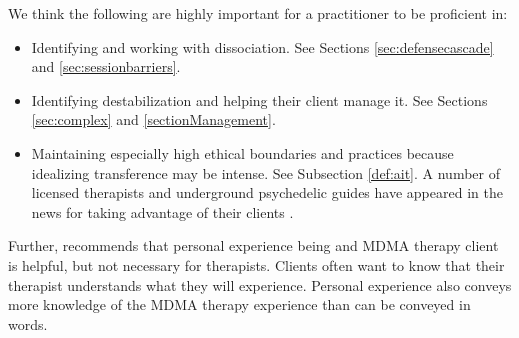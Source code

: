 \documentclass[12pt,letterpaper]{book}
\begin{document}
We think the following are highly important for a practitioner to be proficient in:
\begin{itemize}
    \item Identifying and working with dissociation. See Sections \ref{sec:defensecascade} and \ref{sec:sessionbarriers}.
    \item Identifying destabilization and helping their client manage it. See Sections \ref{sec:complex} and \ref{sectionManagement}.
    \item Maintaining especially high ethical boundaries and practices because idealizing transference may be intense. See Subsection \ref{def:ait}. A number of licensed therapists and underground psychedelic guides have appeared in the news for taking advantage of their clients \cite{powerTrip}.
\end{itemize}
Further, \textcite{simmering} recommends that personal experience being and MDMA therapy client is helpful, but not necessary for therapists. Clients often want to know that their therapist understands what they will experience. Personal experience also conveys more knowledge of the MDMA therapy experience than can be conveyed in words.
\end{document}

